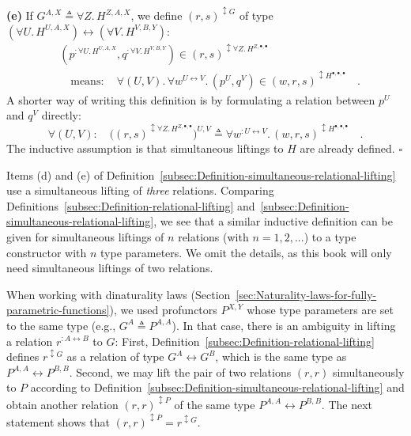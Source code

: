\textbf{(e)} If $G^{A,X}\triangleq\forall Z.\,H^{Z,A,X}$, we define
$(r,s)^{\updownarrow G}$ of type $(\forall U.\,H^{U,A,X})\leftrightarrow(\forall V.\,H^{V,B,Y})$:
\begin{align*}
 & (p^{:\forall U.\,H^{U,A,X}},q^{:\forall V.\,H^{V,B,Y}})\in(r,s)^{\updownarrow\forall Z.\,H^{Z,\bullet,\bullet}}\\
 & \quad\text{means}:\quad\forall(U,V).\,\forall w^{U\leftrightarrow V}.\,(p^{U},q^{V})\in(w,r,s)^{\updownarrow H^{\bullet,\bullet,\bullet}}\quad.
\end{align*}
A shorter way of writing this definition is by formulating a relation
between $p^{U}$ and $q^{V}$ directly:
\begin{equation}
\forall(U,V):\quad\big((r,s)^{\updownarrow\forall Z.\,H^{Z,\bullet,\bullet}}\big)^{U,V}\triangleq\forall w^{:U\leftrightarrow V}.\,(w,r,s)^{\updownarrow H^{\bullet,\bullet,\bullet}}\quad.\label{eq:relational-lifting-quantified-types-short-1}
\end{equation}
The inductive assumption is that simultaneous liftings to $H$ are
already defined. $\square$

Items (d) and (e) of Definition~\ref{subsec:Definition-simultaneous-relational-lifting}
use a simultaneous lifting of \emph{three} relations. Comparing Definitions~\ref{subsec:Definition-relational-lifting}
and~\ref{subsec:Definition-simultaneous-relational-lifting}, we
see that a similar inductive definition can be given for simultaneous
liftings of $n$ relations (with $n=1,2,...$) to a type constructor
with $n$ type parameters. We omit the details, as this book will
only need simultaneous liftings of two relations.

When working with dinaturality laws (Section~\ref{sec:Naturality-laws-for-fully-parametric-functions}),
we used profunctors $P^{X,Y}$ whose type parameters are set to the
same type (e.g., $G^{A}\triangleq P^{A,A}$). In that case, there
is an ambiguity in lifting a relation $r^{:A\leftrightarrow B}$ to
$G$: First, Definition~\ref{subsec:Definition-relational-lifting}
defines $r^{\updownarrow G}$ as a relation of type $G^{A}\leftrightarrow G^{B}$,
which is the same type as $P^{A,A}\leftrightarrow P^{B,B}$. Second,
we may lift the pair of two relations $\left(r,r\right)$ simultaneously
to $P$ according to Definition~\ref{subsec:Definition-simultaneous-relational-lifting}
and obtain another relation $\left(r,r\right)^{\updownarrow P}$ of
the same type $P^{A,A}\leftrightarrow P^{B,B}$. The next statement
shows that $(r,r)^{\updownarrow P}=r^{\updownarrow G}$.

